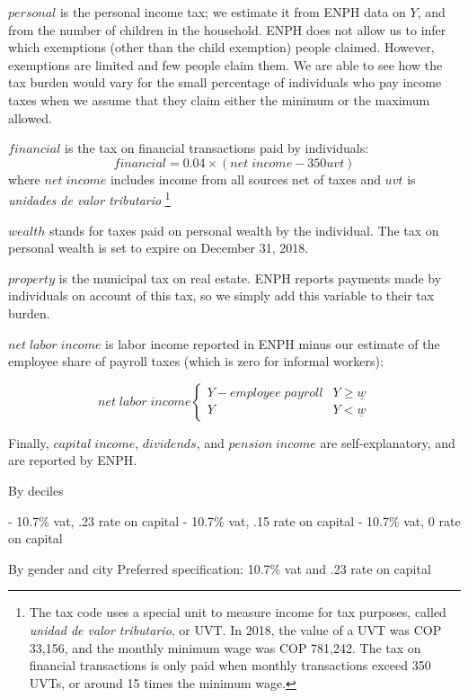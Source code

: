 \documentclass[12pt]{article}
\begin{document}
$personal$ is the personal income tax; we estimate it from ENPH data on $Y$, and from the number of children in the household.
ENPH does not allow us to infer which exemptions (other than the child exemption) people claimed.
However, exemptions are limited and few people claim them.
We are able to see how the tax burden would vary for the small percentage of individuals who pay income taxes when we assume that they claim either the minimum or the maximum allowed.

$financial$ is the tax on financial transactions paid by individuals:
\begin{equation}
  financial=0.04 \times (net \;income -350uvt)
\end{equation}
where $net \;income$ includes income from all sources net of taxes and $uvt$ is \textit{unidades de valor tributario}  \footnote{The tax code uses a special unit to measure income for tax purposes, called \textit{unidad de valor tributario}, or UVT.
  In 2018, the value of a UVT was COP 33,156, and the monthly minimum wage was COP 781,242.
  The tax on financial transactions is only paid when monthly transactions exceed 350 UVTs, or around 15 times the minimum wage.}

$wealth$ stands for taxes paid on personal wealth by the individual.
The tax on personal wealth is set to expire on December 31, 2018.

$property$ is the municipal tax on real estate.
ENPH reports payments made by individuals on account of this tax, so we simply add this variable to their tax burden.

$net \; labor \;income$ is labor income reported in ENPH minus our estimate of the employee share of payroll taxes (which is zero for informal workers):

\begin{equation}
net \; labor \;income
  \begin{cases}
	Y - employee \; payroll& Y \geq \underline{w} \\
	Y &  Y < \underline{w}
  \end{cases}
\end{equation}


Finally, $capital \; income$, $dividends$, and $pension \; income$ are self-explanatory, and are reported by ENPH.

By deciles

- 10.7\% vat, .23 rate on capital
- 10.7\% vat, .15 rate on capital
- 10.7\% vat,  0 rate on capital


By gender and city
Preferred specification: 10.7\% vat and .23 rate on capital
\end{document}
